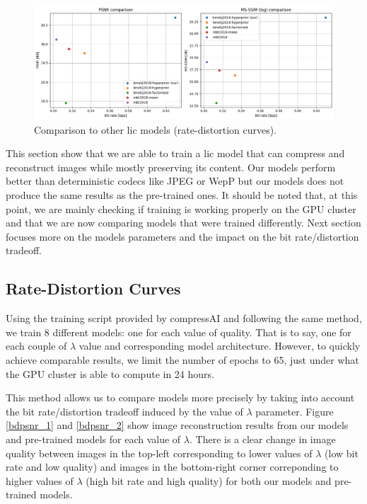 \begin{figure}
    \centering
    \includegraphics[width=15cm]{img/balle_repro_6.png}
    \caption{Comparison to other \acrshort{lic} models (rate-distortion curves).}
    \label{balle_repro_6}
\end{figure}

This section show that we are able to train a \acrshort{lic} model that can compress and reconstruct images while mostly preserving its content. Our models perform better than deterministic codecs like JPEG or WepP but our models does not produce the same results as the pre-trained ones. It should be noted that, at this point, we are mainly checking if training is working properly on the GPU cluster and that we are now comparing models that were trained differently. Next section focuses more on the models parameters and the impact on the bit rate/distortion tradeoff.

\subsection{Rate-Distortion Curves}
Using the training script provided by compressAI and following the same method, we train 8 different models: one for each value of \textsf{quality}. That is to say, one for each couple of \(\lambda\) value and corresponding model architecture. However, to quickly achieve comparable results, we limit the number of epochs to 65, just under what the GPU cluster is able to compute in 24 hours.

This method allows us to compare models more precisely by taking into account the bit rate/distortion tradeoff induced by the value of \(\lambda\) parameter. Figure \ref{bdpsnr_1} and \ref{bdpsnr_2} show image reconstruction results from our models and pre-trained models for each value of \(\lambda\). There is a clear change in image quality between images in the top-left corresponding to lower values of \(\lambda\) (low bit rate and low quality) and images in the bottom-right corner correponding to higher values of \(\lambda\) (high bit rate and high quality) for both our models and pre-trained models.

